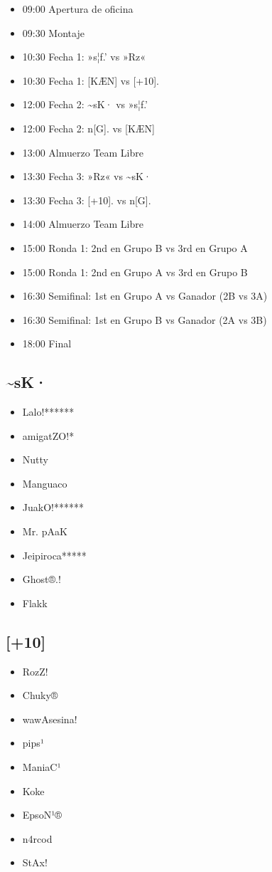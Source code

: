 \documentclass[a4paper, 11pt]{article}
\begin{document}
    \begin{itemize}
        \item 09:00 Apertura de oficina
        \item 09:30 Montaje
        \item 10:30 Fecha 1: »s¦ƒ.' vs »Rz«
        \item 10:30 Fecha 1: [KÆN] vs [+10].
        \item 12:00 Fecha 2: {\textasciitilde sK·} vs »s¦ƒ.'
        \item 12:00 Fecha 2: n[G]. vs [KÆN]
        \item 13:00 Almuerzo Team Libre
        \item 13:30 Fecha 3: »Rz« vs {\textasciitilde sK·}
        \item 13:30 Fecha 3: [+10]. vs n[G].
        \item 14:00 Almuerzo Team Libre
        \item 15:00 Ronda 1: 2nd en Grupo B vs 3rd en Grupo A
        \item 15:00 Ronda 1: 2nd en Grupo A vs 3rd en Grupo B
        \item 16:30 Semifinal: 1st en Grupo A vs Ganador (2B vs 3A)
        \item 16:30 Semifinal: 1st en Grupo B vs Ganador (2A vs 3B)
        \item 18:00 Final
    \end{itemize}
    \clearpage

    \subsection{\textasciitilde sK·}
    \begin{itemize}
        \item Lalo!******
        \item amigatZO!*
        \item Nutty
        \item Manguaco
        \item JuakO!******
        \item Mr. pAaK
        \item Jeipiroca*****
        \item Ghost®.!
        \item Flakk
    \end{itemize}

    \subsection{[+10]}
    \begin{itemize}
        \item RozZ!
        \item Chuky®
        \item wawAsesina!
        \item pips¹
        \item ManiaC¹
        \item Koke
        \item EpsoN¹®
        \item n4rcod
        \item StAx!
    \end{itemize}
\end{document}

